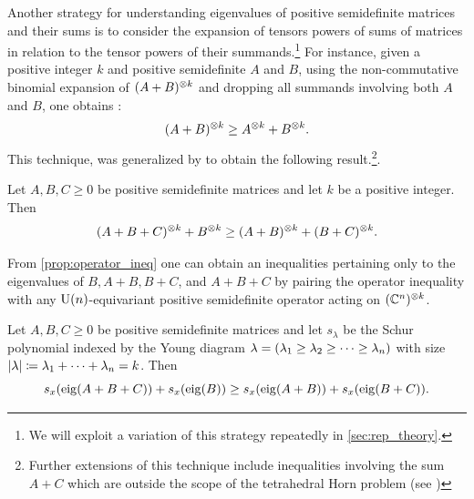 \documentclass[notitlepage, 10pt]{article}
\begin{document}
Another strategy for understanding eigenvalues of positive semidefinite matrices and their sums is to consider the expansion of tensors powers of sums of matrices in relation to the tensor powers of their summands.\footnote{We will exploit a variation of this strategy repeatedly in \cref{sec:rep_theory}.}
For instance, given a positive integer $k$ and positive semidefinite $A$ and $B$, using the non-commutative binomial expansion of $(A+B)^{\otimes k}$ and dropping all summands involving both $A$ and $B$, one obtains \cite[Proposition 1.1]{berndt2015hlawka}:
\begin{equation}
    (A+B)^{\otimes k} \geq A^{\otimes k} + B^{\otimes k}.
\end{equation}
This technique, was generalized by \cite{tie2011rearrangement} \cite[Lemma 2.2]{tie2011rearrangement} to obtain the following result.\footnote{Further extensions of this technique include inequalities involving the sum $A+C$ which are outside the scope of the tetrahedral Horn problem (see \cite{lin2014determinantal,berndt2015hlawka,niculescu2023functions})}.
\begin{prop}
    \label{prop:operator_ineq}
    Let $A,B,C \geq 0$ be positive semidefinite matrices and let $k$ be a positive integer.
    Then
    \begin{equation}
        (A+B+C)^{\otimes k} + B^{\otimes k} \geq (A+B)^{\otimes k} + (B+C)^{\otimes k}.
    \end{equation}
\end{prop}
From \cref{prop:operator_ineq} one can obtain an inequalities pertaining only to the eigenvalues of $B, A+B, B+C$, and $A+B+C$ by pairing the operator inequality with any $\operatorname{U}(n)$-equivariant positive semidefinite operator acting on $(\mathbb C^{n})^{\otimes k}$.\footnotemark{}
\begin{cor}
    \label{cor:schur_ineq}
    Let $A,B,C \geq 0$ be positive semidefinite matrices and let $s_{\lambda}$ be the Schur polynomial indexed by the Young diagram $\lambda = (\lambda_1 \geq \lambda_2 \geq \cdots \geq \lambda_n)$ with size $\left|\lambda\right| \coloneqq \lambda_1 + \cdots + \lambda_n = k$.
    Then
    \begin{equation}
        \label{eq:schur_ineq}
        s_{x}(\operatorname{eig}(A+B+C)) + s_{x}(\operatorname{eig}(B)) \geq s_{x}(\operatorname{eig}(A+B)) + s_{x}(\operatorname{eig}(B+C)).
    \end{equation}
\end{cor}
\end{document}
